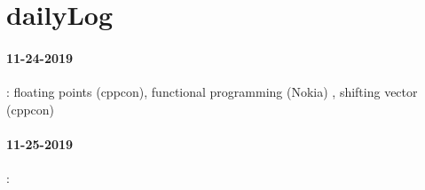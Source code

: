 \section{dailyLog}
\paragraph{11-24-2019}: floating points (cppcon), functional programming (Nokia) , shifting vector (cppcon)
\paragraph{11-25-2019}:



